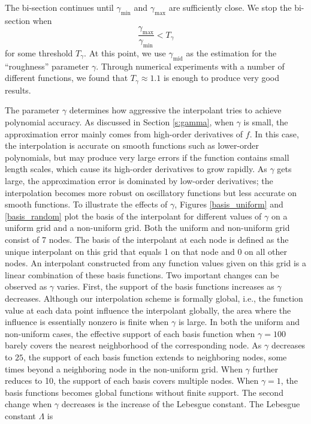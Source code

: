 The bi-section continues until $\gamma_{\min}$ and $\gamma_{\max}$ are
sufficiently close.  We stop the bi-section when
\[ \frac{\gamma_{\max}}{\gamma_{\min}} < T_\gamma \]
for some threshold $T_\gamma$.  At this point, we use $\gamma_{\mathrm{mid}}$
as the estimation for the ``roughness'' parameter $\gamma$.
Through numerical experiments with a number of different functions, we found
that $T_\gamma \approx 1.1$ is enough to produce very good results.

The parameter $\gamma$ determines how aggressive the interpolant tries to
achieve polynomial accuracy.  As discussed in Section \ref{s:gamma},
when $\gamma$
is small, the approximation error mainly comes from high-order derivatives of
$f$.  In this case, the interpolation is accurate on smooth functions such as
lower-order polynomials, but may produce very large errors if the function
contains small length scales, which cause its high-order derivatives to grow
rapidly.  As $\gamma$ gets large, the approximation error is dominated by
low-order derivatives; the interpolation becomes more robust on
oscillatory functions but less accurate on smooth functions.  To illustrate
the effects of $\gamma$, Figures \ref{basis_uniform} and \ref{basis_random}
plot the basis of the interpolant for different values of $\gamma$ on a uniform
grid and a non-uniform grid.  Both the uniform and non-uniform grid consist
of 7 nodes.  The basis of the interpolant at each node is defined as the
unique interpolant on this grid that equals 1 on that node and 0 on all other
nodes.  An interpolant constructed from any function values given on this grid
is a linear combination of these basis functions.  Two important changes can
be observed as $\gamma$ varies.  First, the support
of the basis functions increases as $\gamma$ decreases.  Although our
interpolation scheme is formally global, i.e., the function value at each data
point influence the interpolant globally, the area where the influence is
essentially nonzero is finite when $\gamma$ is large.  In both the uniform and
non-uniform cases, the effective support of each basis function when
$\gamma=100$ barely covers the nearest neighborhood of the corresponding node.
As $\gamma$ decreases to $25$, the support of each basis function extends to
neighboring nodes, some times beyond a neighboring node in the non-uniform
grid.  When $\gamma$ further reduces to 10, the support of each basis covers
multiple nodes.  When $\gamma = 1$, the basis functions becomes global
functions without finite support.  The second change when $\gamma$ decreases is
the increase of the Lebesgue constant.  The Lebesgue constant $\Lambda$ is
